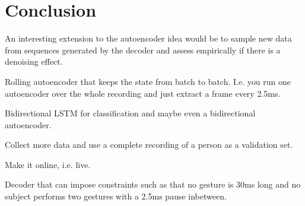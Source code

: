 \chapter{Conclusion}
\label{cha:conclusion}

An interesting extension to the autoencoder idea would be to sample new data
from sequences generated by the decoder and assess empirically if there is a
denoising effect.

Rolling autoencoder that keeps the state from batch to batch. I.e. you run one
autoencoder over the whole recording and just extract a frame every 2.5ms.

Bidirectional LSTM for classification and maybe even a bidirectional
autoencoder.

Collect more data and use a complete recording of a person as a validation set.

Make it online, i.e. live.

Decoder that can impose constraints such as that no gesture is 30ms long and no
subject performs two gestures with a 2.5ms pause inbetween.
